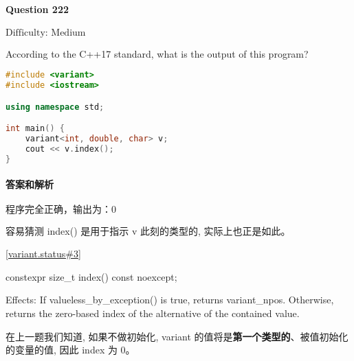 \documentclass{article}
\begin{document}
	\paragraph*{Question 222} $\boxed{\text{Difficulty: Medium}} $			
	
	According to the C++17 standard, what is the output of this program?
	
	\begin{lstlisting}[language=C++]  		
#include <variant>
#include <iostream>

using namespace std;

int main() {
	variant<int, double, char> v;
	cout << v.index();
}
	\end{lstlisting}
	
	\paragraph*{答案和解析} $\boxed{\text{程序完全正确，输出为：0}} $
	
	容易猜测 index() 是用于指示 v 此刻的类型的, 实际上也正是如此。
	
	\href{https://timsong-cpp.github.io/cppwp/n4659/variant.status#3}{[variant.status\#3]}
	
	\begin{lightgrayleftbar}
		constexpr size\_t index() const noexcept;
		
		Effects: If valueless\_­by\_­exception() is true, returns variant\_­npos. Otherwise, returns the zero-based index of the alternative of the contained value. 
	\end{lightgrayleftbar}

	在上一题我们知道, 如果不做初始化, variant 的值将是\textbf{第一个类型的}、被值初始化的变量的值, 因此 index 为 0。
\end{document}
